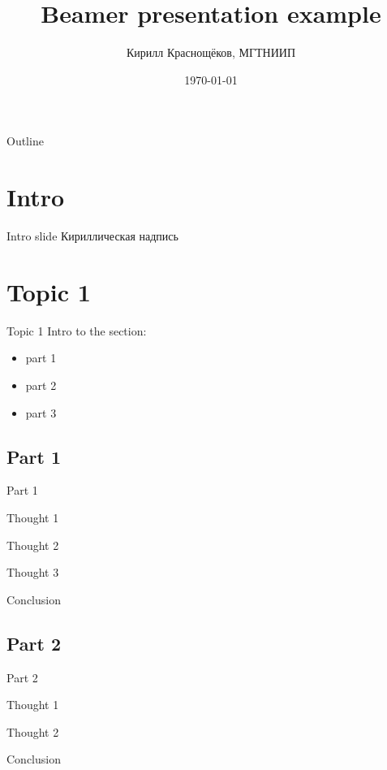 \documentclass[presentation]{beamer}
\author[]{Кирилл Краснощёков, МГТНИИП}
\date{\today}
\title{Beamer presentation example}
\begin{document}
\maketitle
\begin{frame}{Outline}
\tableofcontents
\end{frame}



\section{Intro}
\label{sec:orgdda4509}
\begin{frame}[label={sec:org8b472b2}]{Intro slide}
Кириллическая надпись
\end{frame}

\section{Topic 1}
\label{sec:org05a27d9}
\begin{frame}[label={sec:orgf645b98}]{Topic 1}
Intro to the section:
\begin{itemize}
\item part 1
\item part 2
\item part 3
\end{itemize}
\end{frame}
\subsection{Part 1}
\label{sec:org0564092}
\begin{frame}[label={sec:org32b8ab6}]{Part 1}
\end{frame}
\begin{frame}[label={sec:org65a5ce3}]{Thought 1}
\end{frame}
\begin{frame}[label={sec:org40efe95}]{Thought 2}
\end{frame}
\begin{frame}[label={sec:org6922c14}]{Thought 3}
\end{frame}
\begin{frame}[label={sec:orgabb3007}]{Conclusion}
\end{frame}
\subsection{Part 2}
\label{sec:orgb3ed19e}
\begin{frame}[label={sec:org87f4a76}]{Part 2}
\end{frame}
\begin{frame}[label={sec:orgb5b7ab1}]{Thought 1}
\end{frame}
\begin{frame}[label={sec:org43980f7}]{Thought 2}
\end{frame}
\begin{frame}[label={sec:org1e4dfa3}]{Conclusion}
\end{frame}
\end{document}
